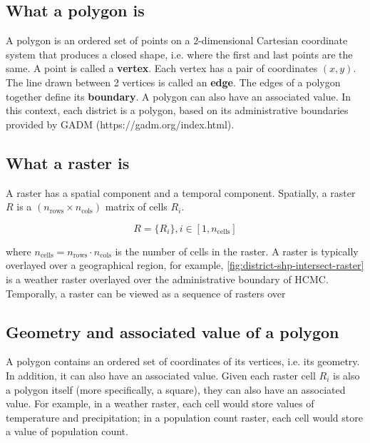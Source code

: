 \documentclass{article}
\begin{document}
\subsection{What a polygon is}

A polygon is an ordered set of points on a 2-dimensional Cartesian coordinate system that produces a closed shape, i.e. where the first and last points are the same. A point is called a \textbf{vertex}. Each vertex has a pair of coordinates $(x, y)$. The line drawn between 2 vertices is called an \textbf{edge}. The edges of a polygon together define its \textbf{boundary}. A polygon can also have an associated value. In this context, each district is a polygon, based on its administrative boundaries provided by GADM (https://gadm.org/index.html).

\subsection{What a raster is}

A raster has a spatial component and a temporal component. Spatially, a raster $R$ is a $(n_\text{rows} \times n_\text{cols})$ matrix of cells $R_i$.

\begin{equation*}
    R = \{R_{i}\}, i \in [1, n_\text{cells}]
\end{equation*}

where $n_\text{cells} = n_\text{rows} \cdot n_\text{cols}$ is the number of cells in the raster. A raster is typically overlayed over a geographical region, for example, \autoref{fig:district-shp-intersect-raster} is a weather raster overlayed over the administrative boundary of HCMC. Temporally, a raster can be viewed as a sequence of rasters over 

\subsection{Geometry and associated value of a polygon} \label{sect:poly-props}

A polygon contains an ordered set of coordinates of its vertices, i.e. its geometry. In addition, it can also have an associated value. Given each raster cell $R_i$ is also a polygon itself (more specifically, a square), they can also have an associated value. For example, in a weather raster, each cell would store values of temperature and precipitation; in a population count raster, each cell would store a value of population count. 
\end{document}
